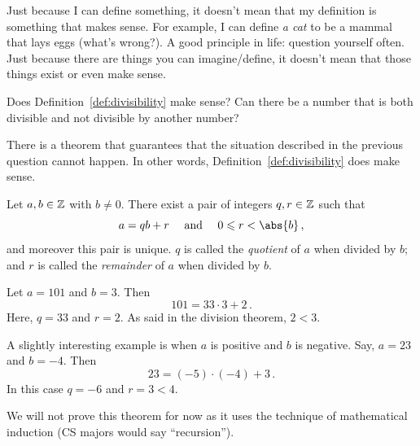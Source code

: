     
    Just because I can define something, it doesn't mean that my definition is 
    something that makes sense.
    For example, I can define \emph{a cat} to be a mammal that lays eggs (what's wrong?).
    A good principle in life: question yourself often. Just because
    there are things you can imagine/define, it doesn't mean that those things exist
    or even make sense.

\begin{question}
    Does Definition~\ref{def:divisibility}  make sense? 
    Can there be a number that is both divisible and not divisible by another number?
\end{question}

There is a theorem that guarantees that the situation described in the previous question cannot happen.
In other words, Definition~\ref{def:divisibility} does make sense.

\begin{theorem}
   Let $a,b \in \mathbb{Z}$ with $b\not= 0$.
   There exist a pair of integers $q,r \in \mathbb{Z}$ such that 
   \begin{equation*}
       a = qb + r \quad \text{ and } \quad 0 \leq r < \abs{b} \,
       ,
   \end{equation*}
   and moreover this pair is unique.
   $q$ is called the \emph{quotient} of $a$ when divided by $b$;
   and $r$ is called the \emph{remainder} of $a$ when divided by $b$.
\end{theorem}

\begin{example}
    Let $a = 101$ and $b = 3$. Then
    \begin{equation*}
        101 = 33\cdot 3 + 2 \,.
    \end{equation*}
    Here, $q =33$ and $r = 2$.
    As said in the division theorem, $2 < 3$.
\end{example}

\begin{example}
   A slightly interesting example is when $ a $ is positive and $b$ is negative.
   Say, $a = 23$ and $b = -4$. Then 
   \begin{equation*}
       23 = (-5) \cdot (-4) + 3 \,.
   \end{equation*}
   In this case $q = -6$ and $r = 3 < 4 $.
\end{example}

We will not prove this theorem for now as it uses the technique of mathematical induction (CS majors would say ``recursion'').

